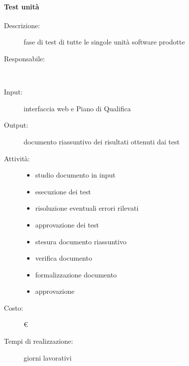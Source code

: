 \paragraph{Test unità}
\begin{description}
\item[Descrizione:] fase di test di tutte le singole unità software prodotte \\

\item[Responsabile:] \\

\item[Input:] interfaccia web e Piano di Qualifica\\

\item[Output:] documento riassuntivo dei risultati ottenuti dai test\\

\item[Attività:]
\begin{itemize}
\item studio documento in input
\item esecuzione dei test
\item risoluzione eventuali errori rilevati
\item approvazione dei test
\item stesura documento riassuntivo
\item verifica documento
\item formalizzazione documento
\item approvazione
\end{itemize}
\item[Costo:] \euro \\
\item[Tempi di realizzazione:]  giorni lavorativi
\end{description}




